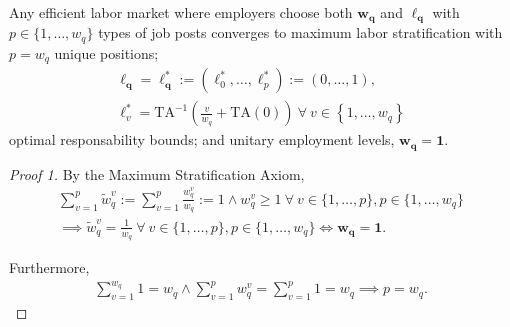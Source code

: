 \documentclass[hidelinks, nonatbib]{elsarticle}
\begin{document}
\begin{lemma}
    Any efficient labor market where employers choose both $\boldsymbol{w_q}$ and $\boldsymbol{\ell_q}$ with $p \in \{1, \dots, w_q\}$ types of job posts converges to maximum labor stratification with
    $
    p = w_q
    $
    unique positions;
    \begin{gather}
    \boldsymbol{\ell_q} = 
    \boldsymbol{\ell_{q}^{*}}
    :=
    (
        \ell_{0}^{*}
        ,
        \dots
        ,
        \ell_{p}^{*}
    )
    :=
    (
        0
        ,
        \dots
        ,
        1
    )
    ,
    \\
    \ell_{v}^{*}
    =
    \text{TA}^{-1}\left(
        \frac{v}{w_q}
        +
        \text{TA}(0)
    \right)
    \
    \forall
    \
    v \in 
    \left\{
        1, \dots, w_q
    \right\}
    \end{gather}
    optimal responsability bounds; and unitary employment levels,
    $
    \boldsymbol{w_q} =
    \boldsymbol{1}
    .
    $
    
    \begin{proof}[Proof 1]
        By the Maximum Stratification Axiom,
        \begin{gather}
        \sum_{v=1}^{p}{
            \tilde{w}_{q}^{v}
        }
        :=
        \sum_{v=1}^{p}{
            \frac{
                w_{q}^{v}
            }{
                w_q
            }
        }
        := 1
        \land
        w_{q}^{v} 
        \geq 
        1
        \
        \forall
        \
        v \in \{1, \dots, p\},
        p \in \{1, \dots, w_q\}
        \\
        \implies
        \tilde{w}_{q}^{v} =
        \frac{1}{w_q}
        \
        \forall
        \
        v \in \{1, \dots, p\},
        p \in \{1, \dots, w_q\}
        \iff
        \boldsymbol{w_q} =
        \boldsymbol{1}
        .
        \end{gather}
        
        Furthermore,
        \begin{gather}
        \sum_{v=1}^{w_q}
        1
        =
        w_q
        \land
        \sum_{v=1}^{p}{
            w_{q}^{v}
        }
        =
        \sum_{v=1}^{p}{
                1
        }
        = w_q
        \implies
        p = w_q
        .
        \end{gather}
        

\end{proof}
\end{lemma}
\end{document}
